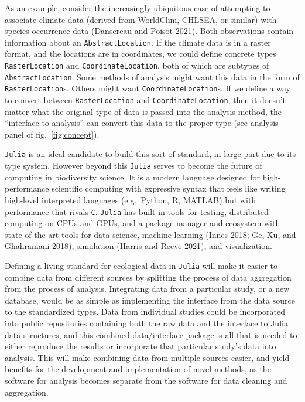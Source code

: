 \documentclass[11pt]{article}
\begin{document}
As an example, consider the increasingly ubiquitous case of attempting
to associate climate data (derived from WorldClim, CHLSEA, or similar)
with species occurrence data (Dansereau and Poisot 2021). Both
observations contain information about an \texttt{AbstractLocation}. If
the climate data is in a raster format, and the locations are in
coordinates, we could define concrete types \texttt{RasterLocation} and
\texttt{CoordinateLocation}, both of which are subtypes of
\texttt{AbstractLocation}. Some methods of analysis might want this data
in the form of \texttt{RasterLocation}s. Others might want
\texttt{CoordinateLocation}s. If we define a way to convert between
\texttt{RasterLocation} and \texttt{CoordinateLocation}, then it doesn't
matter what the original type of data is passed into the analysis
method, the ``interface to analysis'' can convert this data to the
proper type (see analysis panel of fig.~\ref{fig:concept}).

\texttt{Julia} is an ideal candidate to build this sort of standard, in
large part due to its type system. However beyond this \texttt{Julia}
serves to become the future of computing in biodiversity science. It is
a modern language designed for high-performance scientific computing
with expressive syntax that feels like writing high-level interpreted
languages (e.g.~Python, R, MATLAB) but with performance that rivals
\texttt{C}. \texttt{Julia} has built-in tools for testing, distributed
computing on CPUs and GPUs, and a package manager and ecosystem with
state-of-the art tools for data science, machine learning (Innes 2018;
Ge, Xu, and Ghahramani 2018), simulation (Harris and Reeve 2021), and
visualization.

Defining a living standard for ecological data in \texttt{Julia} will
make it easier to combine data from different sources by splitting the
process of data aggregation from the process of analysis. Integrating
data from a particular study, or a new database, would be as simple as
implementing the interface from the data source to the standardized
types. Data from individual studies could be incorporated into public
repositories containing both the raw data and the interface to Julia
data structures, and this combined data/interface package is all that is
needed to either reproduce the results or incorporate that particular
study's data into analysis. This will make combining data from multiple
sources easier, and yield benefits for the development and
implementation of novel methods, as the software for analysis becomes
separate from the software for data cleaning and aggregation.
\end{document}
